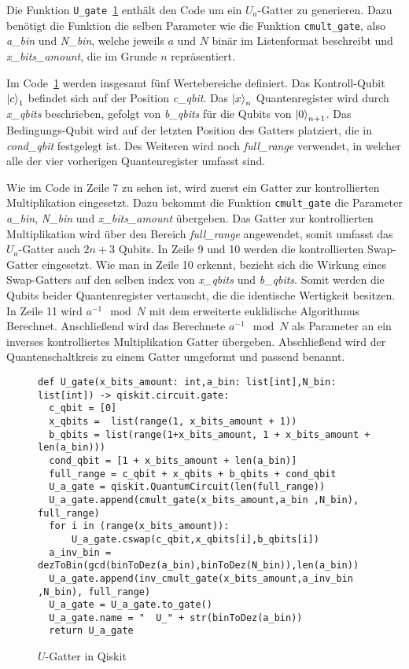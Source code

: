 Die Funktion \texttt{U\_gate}~\ref{code:UGatter} enthält den Code um ein \(U_a\)-Gatter zu generieren.
Dazu benötigt die Funktion die selben Parameter wie die Funktion \texttt{cmult\_gate}, 
also \textit{a\_bin} und \textit{N\_bin}, welche jeweils \(a\) und \(N\) binär im Listenformat beschreibt und 
\textit{x\_bits\_amount}, die im Grunde \(n\) repräsentiert.

Im Code~\ref{code:UGatter} werden insgesamt fünf Wertebereiche definiert.
Das Kontroll-Qubit \(\ket{c}_1\) befindet sich auf der Position \textit{c\_qbit}.
Das \(\ket{x}_{n}\) Quantenregister wird durch \textit{x\_qbits} beschrieben, 
gefolgt von \textit{b\_qbits} für die Qubits von \(\ket{0}_{n+1}\).
Das Bedingungs-Qubit wird auf der letzten Position des Gatters platziert, die in \textit{cond\_qbit} festgelegt ist.
Des Weiteren wird noch \textit{full\_range} verwendet,
in welcher alle der vier vorherigen Quantenregister umfasst sind.

Wie im Code in Zeile 7 zu sehen ist, wird zuerst ein Gatter zur kontrollierten Multiplikation eingesetzt.
Dazu bekommt die Funktion \texttt{cmult\_gate} die Parameter \textit{a\_bin}, \textit{N\_bin} und \textit{x\_bits\_amount} übergeben.
Das Gatter zur kontrollierten Multiplikation wird über den Bereich \textit{full\_range} angewendet, 
somit umfasst das \(U_a\)-Gatter auch \(2n+3\) Qubits.
In Zeile 9 und 10 werden die kontrollierten Swap-Gatter eingesetzt.
Wie man in Zeile 10 erkennt, bezieht sich die Wirkung eines Swap-Gatters auf den selben index von \textit{x\_qbits} und \textit{b\_qbits}.
Somit werden die Qubits beider Quantenregister vertauscht, die die identische Wertigkeit besitzen.
In Zeile 11 wird \(a^{-1}\mod N\) mit dem erweiterte euklidische Algorithmus Berechnet.
Anschließend wird das Berechnete \(a^{-1}\mod N\) als Parameter an ein inverses kontrolliertes Multiplikation Gatter übergeben.
Abschließend wird der Quantenschaltkreis zu einem Gatter umgeformt und passend benannt.

\begin{figure}[H]
  \caption{\(U\)-Gatter in Qiskit}
  \label{code:UGatter}
\begin{verbatim}  
def U_gate(x_bits_amount: int,a_bin: list[int],N_bin: list[int]) -> qiskit.circuit.gate:  
  c_qbit = [0]
  x_qbits =  list(range(1, x_bits_amount + 1))
  b_qbits = list(range(1+x_bits_amount, 1 + x_bits_amount + len(a_bin)))
  cond_qbit = [1 + x_bits_amount + len(a_bin)]
  full_range = c_qbit + x_qbits + b_qbits + cond_qbit
  U_a_gate = qiskit.QuantumCircuit(len(full_range))
  U_a_gate.append(cmult_gate(x_bits_amount,a_bin ,N_bin), full_range)
  for i in (range(x_bits_amount)):
      U_a_gate.cswap(c_qbit,x_qbits[i],b_qbits[i])
  a_inv_bin = dezToBin(gcd(binToDez(a_bin),binToDez(N_bin)),len(a_bin))
  U_a_gate.append(inv_cmult_gate(x_bits_amount,a_inv_bin ,N_bin), full_range)
  U_a_gate = U_a_gate.to_gate()
  U_a_gate.name = "  U_" + str(binToDez(a_bin))
  return U_a_gate
  \end{verbatim}
\end{figure}

